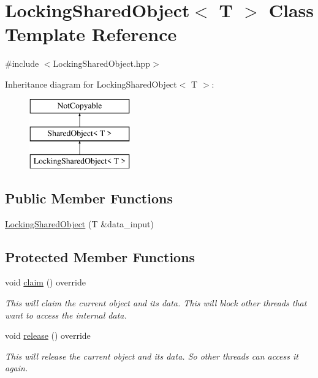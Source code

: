 \hypertarget{class_locking_shared_object}{}\section{Locking\+Shared\+Object$<$ T $>$ Class Template Reference}
\label{class_locking_shared_object}


{\ttfamily \#include $<$Locking\+Shared\+Object.\+hpp$>$}

Inheritance diagram for Locking\+Shared\+Object$<$ T $>$\+:\begin{figure}[H]
\begin{center}
\leavevmode
\includegraphics[height=3.000000cm]{class_locking_shared_object}
\end{center}
\end{figure}
\subsection*{Public Member Functions}
\begin{DoxyCompactItemize}
\item 
\hyperlink{class_locking_shared_object_a5e43531cc76d339d8f4429ce3b054839}{Locking\+Shared\+Object} (T \&data\+\_\+input)
\end{DoxyCompactItemize}
\subsection*{Protected Member Functions}
\begin{DoxyCompactItemize}
\item 
\hypertarget{class_locking_shared_object_a1e134302086b9fa746adc764890d902c}{}void \hyperlink{class_locking_shared_object_a1e134302086b9fa746adc764890d902c}{claim} () override\label{class_locking_shared_object_a1e134302086b9fa746adc764890d902c}

\begin{DoxyCompactList}\small\item\em This will claim the current object and it\textquotesingle{}s data. This will block other threads that want to access the internal data. \end{DoxyCompactList}\item 
\hypertarget{class_locking_shared_object_a6164223bc1e47aabef8d69ded4486d94}{}void \hyperlink{class_locking_shared_object_a6164223bc1e47aabef8d69ded4486d94}{release} () override\label{class_locking_shared_object_a6164223bc1e47aabef8d69ded4486d94}

\begin{DoxyCompactList}\small\item\em This will release the current object and it\textquotesingle{}s data. So other threads can access it again. \end{DoxyCompactList}\end{DoxyCompactItemize}
